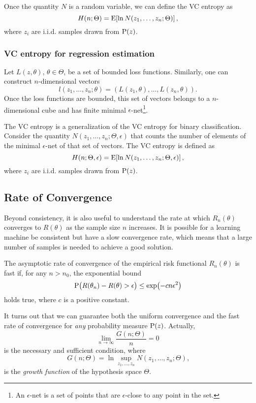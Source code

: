 Once the quantity $N$ is a random variable, we can define the VC entropy as
\[
  H(n; \Theta) = \operatorname{E}\!\left[ \ln N(z_1, \dots, z_n; \Theta) \right]\text{,}
\]
where $z_i$ are i.i.d. samples drawn from $\operatorname{P}(z)$.

\subsubsection{VC entropy for regression estimation}

Let $L(z, \theta)$, $\theta \in \Theta$, be a set of bounded loss functions.  Similarly,
one can construct $n$-dimensional vectors
\[
  l(z_1, \dots, z_n; \theta) = \left( L(z_1, \theta), \dots, L(z_n, \theta) \right)\text{.}
\]
Once the loss functions are bounded, this set of vectors belongs to a $n$-dimensional
cube and has finite minimal $\epsilon$-net\footnote{An $\epsilon$-net is a set of points
that are $\epsilon$-close to any point in the set.}.

The VC entropy is a generalization of the VC entropy for binary classification.
Consider the quantity $N(z_1, \dots, z_n; \Theta, \epsilon)$ that counts the number of
elements of the minimal $\epsilon$-net of that set of vectors.  The VC entropy is defined
as
\[
  H(n; \Theta, \epsilon) = \operatorname{E}\!\left[ \ln N(z_1, \dots, z_n; \Theta, \epsilon) \right]\text{,}
\]
where $z_i$ are i.i.d. samples drawn from $\operatorname{P}(z)$.

\subsection{Rate of Convergence}

Beyond consistency, it is also useful to understand the rate at which $R_n(\theta)$
converges to $R(\theta)$ as the sample size $n$ increases.  It is possible for a learning
machine be consistent but have a slow convergence rate, which means that a large number of
samples is needed to achieve a good solution.

The asymptotic rate of convergence of the empirical risk functional $R_n(\theta)$ is
fast if, for any $n > n_0$, the exponential bound
\[
  \operatorname{P}\!\big(R(\theta_n) - R(\theta) > \epsilon\big) \leq \exp\!\left( - c n \epsilon^2 \right)
\]
holds true, where $c$ is a positive constant.

It turns out that we can guarantee both the uniform convergence and the fast rate of
convergence for \emph{any} probability measure $\operatorname{P}(z)$.  Actually,
\[
  \lim_{n \to \infty} \frac{G(n; \Theta)}{n} = 0
\]
is the necessary and sufficient condition, where
\[
  G(n; \Theta) = \ln \sup_{z_1, \dots, z_n} N(z_1, \dots, z_n; \Theta)\text{,}
\]
is the \emph{growth function} of the hypothesis space $\Theta$.

